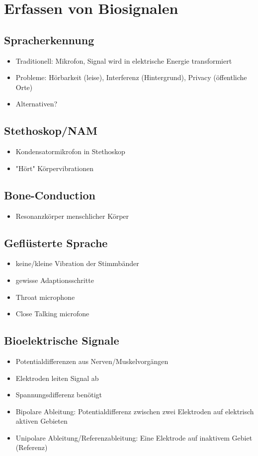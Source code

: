 \documentclass[a4paper,10pt,oneside]{article}
\begin{document}
\section{Erfassen von Biosignalen}


\subsection{Spracherkennung}
\begin{itemize}
	\item Traditionell: Mikrofon, Signal wird in elektrische Energie transformiert
	\item Probleme: Hörbarkeit (leise), Interferenz (Hintergrund), Privacy (öffentliche Orte)
	\item Alternativen?
\end{itemize}


\subsection{Stethoskop/NAM}
\begin{itemize}
	\item Kondensatormikrofon in Stethoskop
	\item "Hört" Körpervibrationen
	
\end{itemize}

\subsection{Bone-Conduction}
\begin{itemize}
	\item Resonanzkörper menschlicher Körper
\end{itemize}


\subsection{Geflüsterte Sprache}
\begin{itemize}
	\item keine/kleine Vibration der Stimmbänder
	\item gewisse Adaptionsschritte
	\item Throat microphone
	\item Close Talking microfone
\end{itemize}

\subsection{Bioelektrische Signale}
\begin{itemize}
	\item Potentialdifferenzen aus Nerven/Muskelvorgängen
	\item Elektroden leiten Signal ab
	\item Spannungsdifferenz benötigt
	\item Bipolare Ableitung: Potentialdifferenz zwischen zwei Elektroden auf elektrisch aktiven Gebieten
	\item Unipolare Ableitung/Referenzableitung: Eine Elektrode auf inaktivem Gebiet (Referenz)
\end{itemize}
\end{document}
